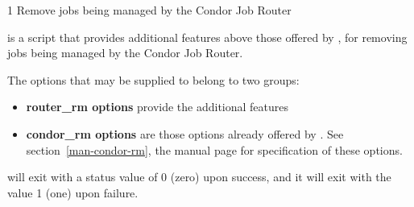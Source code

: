 \begin{ManPage}{\label{man-condor-router-rm}}{1}
{Remove jobs being managed by the Condor Job Router}
\Synopsis {}


\Description
{} is a script that provides additional features
above those offered by , 
for removing jobs being managed by the Condor Job Router. 

The options that may be supplied to  belong to two groups:
\begin{itemize}
	\item \textbf{router\_rm options} provide the additional features
	\item \textbf{condor\_rm options} are those options already offered
by .  See section~\ref{man-condor-rm},
the  manual page for specification of these options. 
\end{itemize}

\begin{Options}
\end{Options}

\ExitStatus

 will exit with a status value of 0 (zero) upon success,
and it will exit with the value 1 (one) upon failure.

\end{ManPage}

